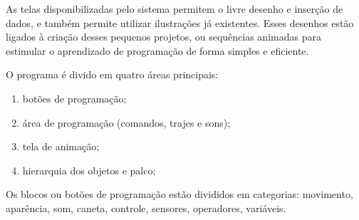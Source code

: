 As telas disponibilizadas pelo sistema permitem o livre desenho e inserção de dados, e também permite utilizar ilustrações já existentes. Esses desenhos estão ligados à criação desses pequenos projetos, ou sequências animadas para estimular o aprendizado de programação de forma simples e eficiente.

O programa é divido em quatro áreas principais:
\begin{enumerate}
	\item botões de programação;
	\item área de programação (comandos, trajes e sons);
	\item tela de animação;
	\item hierarquia dos objetos e palco;
\end{enumerate}

Os blocos ou botões de programação estão divididos em categorias: movimento, aparência, som, caneta, controle, sensores, operadores, variáveis.
